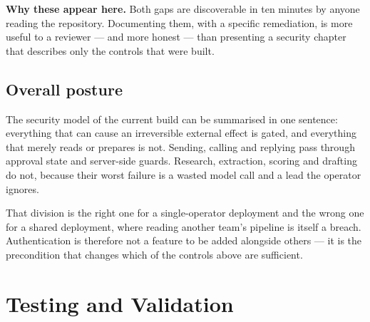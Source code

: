 \documentclass[11pt,a4paper]{report}
\begin{document}
\begin{infobox}
\textbf{Why these appear here.} Both gaps are discoverable in ten minutes by anyone reading the repository. Documenting them, with a specific remediation, is more useful to a reviewer --- and more honest --- than presenting a security chapter that describes only the controls that were built.
\end{infobox}

\section{Overall posture}
The security model of the current build can be summarised in one sentence: everything that can cause an irreversible external effect is gated, and everything that merely reads or prepares is not. Sending, calling and replying pass through approval state and server-side guards. Research, extraction, scoring and drafting do not, because their worst failure is a wasted model call and a lead the operator ignores.

That division is the right one for a single-operator deployment and the wrong one for a shared deployment, where reading another team's pipeline is itself a breach. Authentication is therefore not a feature to be added alongside others --- it is the precondition that changes which of the controls above are sufficient.

\chapter{Testing and Validation}
\end{document}
